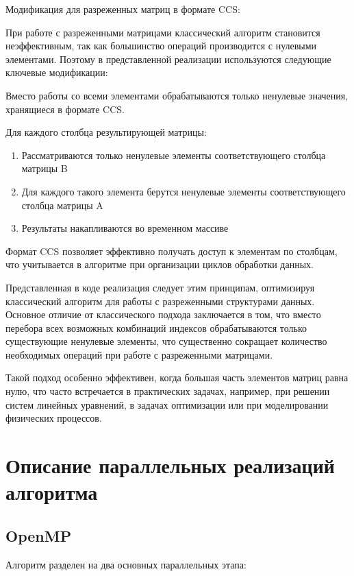 \documentclass[12pt]{article}
\begin{document}
Модификация для разреженных матриц в формате CCS:

При работе с разреженными матрицами классический алгоритм становится неэффективным, так как большинство операций производится с нулевыми элементами. Поэтому в представленной реализации используются следующие ключевые модификации:

Вместо работы со всеми элементами обрабатываются только ненулевые значения, хранящиеся в формате CCS.

Для каждого столбца результирующей матрицы:
\begin{enumerate}
\item Рассматриваются только ненулевые элементы соответствующего столбца матрицы B
\item Для каждого такого элемента берутся ненулевые элементы соответствующего столбца матрицы A
\item Результаты накапливаются во временном массиве
\end{enumerate}

Формат CCS позволяет эффективно получать доступ к элементам по столбцам, что учитывается в алгоритме при организации циклов обработки данных.

Представленная в коде реализация следует этим принципам, оптимизируя классический алгоритм для работы с разреженными структурами данных. Основное отличие от классического подхода заключается в том, что вместо перебора всех возможных комбинаций индексов обрабатываются только существующие ненулевые элементы, что существенно сокращает количество необходимых операций при работе с разреженными матрицами.

Такой подход особенно эффективен, когда большая часть элементов матриц равна нулю, что часто встречается в практических задачах, например, при решении систем линейных уравнений, в задачах оптимизации или при моделировании физических процессов.

\section{Описание параллельных реализаций алгоритма}

\subsection{OpenMP}

Алгоритм разделен на два основных параллельных этапа:
\end{document}
